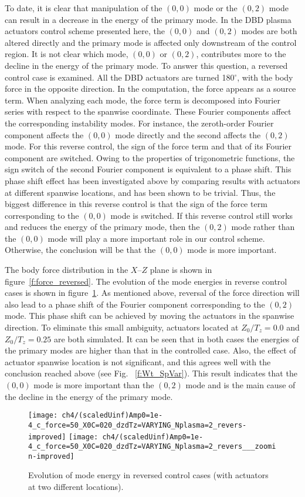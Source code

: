 To date, it is clear that  manipulation of the $(0,0)$ mode \cite{Saric1998} or the $(0,2)$ mode can result in a decrease in the energy of the primary mode. In the DBD plasma actuators control scheme presented here, the $(0,0)$ and $(0,2)$ modes are both altered directly and the primary mode is  affected only downstream of the control region. It is not clear which mode, $(0,0)$ or $(0,2)$, contributes more to the decline in the energy of the primary mode. To answer this question, a reversed control case is examined. All the DBD actuators are turned 180$^\circ$, with  the body force in the opposite direction. In the computation, the force appears as a source term. When analyzing each mode, the force term is decomposed into Fourier series with respect to the spanwise coordinate. These Fourier components affect the corresponding instability modes. For instance, the zeroth-order Fourier component affects the $(0,0)$ mode directly and the second affects the $(0,2)$ mode. For this reverse control, the sign of the force term and that of its Fourier component are switched. Owing to the properties of trigonometric functions, the sign switch of the second Fourier component is equivalent to a phase shift. This phase shift effect has been investigated above by comparing  results with actuators at different spanwise locations, and has been shown to be trivial. Thus, the biggest difference in this reverse control is that the sign of the force term corresponding to the $(0,0)$ mode is switched. If this reverse control still works and reduces the energy of the primary mode, then the $(0,2)$ mode rather than the $(0,0)$ mode will play a more important role in our control scheme. Otherwise, the conclusion will be that the $(0,0)$ mode is more important.

The body force distribution in the $X$--$Z$ plane is shown in figure~\ref{f:force_reversed}. The evolution of the mode energies in reverse control cases is shown in figure~\ref{f:model_energy_revers}. As mentioned above, reversal of the force direction  will also lead to a phase shift of the Fourier component corresponding to the $(0,2)$ mode. This phase shift can be achieved by moving the actuators in the spanwise direction. To eliminate this small ambiguity, actuators located at $Z_0/T_z=0.0$ and $Z_0/T_z=0.25$ are both simulated. It can be seen that in both cases the energies of the primary modes are higher than that in the controlled case. Also, the effect of actuator spanwise location  is not significant, and this agrees well with the conclusion reached above (see Fig.~ \ref{f:Wt_SpVar}). This result indicates that the $(0,0)$ mode is more important than the $(0,2)$ mode and  is the main cause of the decline in the energy of the primary mode.
\begin{figure}
\centering
\texttt{[image: ch4/(scaledUinf)Amp0=1e-4\_c\_force=50\_X0C=020\_dzdTz=VARYING\_Nplasma=2\_revers-improved]}
\texttt{[image: ch4/(scaledUinf)Amp0=1e-4\_c\_force=50\_X0C=020\_dzdTz=VARYING\_Nplasma=2\_revers\_\_\_zoomin-improved]}
\caption{Evolution of mode energy in reversed control cases (with actuators at two different locations).}%
\label{f:model_energy_revers}
\end{figure}

